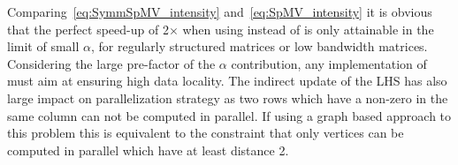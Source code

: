 Comparing~\cref{eq:SymmSpMV_intensity} and~\cref{eq:SpMV_intensity} it is obvious that the perfect speed-up of 2$\times$ when using \SymmSpmv instead of \SpMV is only attainable in the limit of small $\alpha$, \ie for regularly structured matrices or low bandwidth matrices. Considering the large pre-factor of the $\alpha$ contribution, any implementation of \SymmSpmv must aim at ensuring high data locality. The indirect update of the LHS has also large impact on parallelization strategy as two rows which have a non-zero in the same column can not be computed in parallel. If using a graph based approach to this problem this is equivalent to the constraint that only vertices can be computed in parallel which have at least distance 2.

\begin{comment}
\subsubsection{\GS and \SYMMGS}
Gauss-Seidel (\GS) is a solver having \DONE dependency. Contrary to the above kernels \GS is in-exact meaning it is an iterative method. \Cref{alg:GS} shows the Gauss-Seidel algorithm where its assumed that the diagonal entries of the matrix are stored as first entry in their corresponding rows.
\begin{algorithm}[H]
	\caption{GS Solve for $x$ : $Ax=b$} 
	\label{alg:GS}
	\begin{algorithmic}[1]
		\FOR{$row=1:nrows$}
		\STATE{$x[row]+=b[row]$}
		\FOR{$idx=rowPtr[row]+1:rowPtr[row+1]$}
		\STATE{$x[row] -= A[idx]*x[col[idx]]$} 
		\ENDFOR
		\STATE{$diag=A[rowPtr[row]]$}
		\STATE{$x[row]/=diag$}
		\ENDFOR
	\end{algorithmic}
\end{algorithm}
Regarding the in-core execution the kernel has same properties as of \SpMV, but requires an additional divide operation per row of the matrix. If the locality ($\alpha$ factor) is not disturbed due to pre-processing the kernel requires same data traffic as of \SpMV. The arithmetic intensity of \GS is the same as that of \SpMV, if we neglect the divide operation that occurs once per every row.
\begin{equation}
\label{eq:GS_intensity}
I_\mathrm{GS} = I_\mathrm{SPMV}
\end{equation}



In general for most of the algorithms one is interested in symmetric operator therefore commonly one would encounter symmetric variant of Gauss-Seidel, so called symmetric Gauss-Seidel (\SYMMGS). The algorithm remains same except that instead of just doing forward sweep shown in \cref{alg:GS} one would follow it with a backward sweep \ie {\tt row=nrows:-1:1}. The intensity of \SYMMGS remains same as of \GS, as we do two times more flops and bring in proportional data.
\end{comment}


